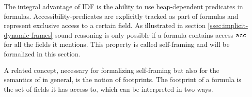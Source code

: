 The integral advantage of IDF is the ability to use heap-dependent predicates in formulas.
Accessibility-predicates are explicitly tracked as part of formulas and represent exclusive access to a certain field.
As illustrated in section \ref{ssec:implicit-dynamic-frames} sound reasoning is only possible if a formula contains access $\textup{\texttt{acc}}$ for all the fields it mentions.
This property is called self-framing and will be formalized in this section.

A related concept, necessary for formalizing self-framing but also for the semantics of \svlidf in general, is the notion of footprints.
The footprint of a formula is the set of fields it has access to, which can be interpreted in two ways.
